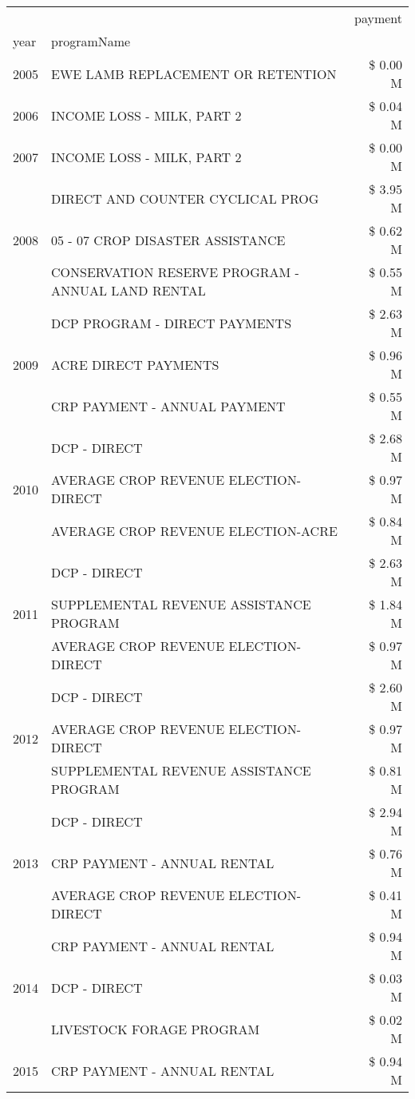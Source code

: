 \begin{tabular}{llr}
\toprule
 &  & payment \\
year & programName &  \\
\midrule
2005 & EWE LAMB REPLACEMENT OR RETENTION & \$ 0.00 M \\
\cline{1-3}
2006 & INCOME LOSS - MILK, PART 2 & \$ 0.04 M \\
\cline{1-3}
2007 & INCOME LOSS - MILK, PART 2 & \$ 0.00 M \\
\cline{1-3}
\multirow[t]{3}{*}{2008} & DIRECT AND COUNTER CYCLICAL PROG & \$ 3.95 M \\
 & 05 - 07 CROP DISASTER ASSISTANCE & \$ 0.62 M \\
 & CONSERVATION RESERVE PROGRAM - ANNUAL LAND RENTAL & \$ 0.55 M \\
\cline{1-3}
\multirow[t]{3}{*}{2009} & DCP PROGRAM - DIRECT PAYMENTS & \$ 2.63 M \\
 & ACRE DIRECT PAYMENTS & \$ 0.96 M \\
 & CRP PAYMENT - ANNUAL PAYMENT & \$ 0.55 M \\
\cline{1-3}
\multirow[t]{3}{*}{2010} & DCP - DIRECT & \$ 2.68 M \\
 & AVERAGE CROP REVENUE ELECTION-DIRECT & \$ 0.97 M \\
 & AVERAGE CROP REVENUE ELECTION-ACRE & \$ 0.84 M \\
\cline{1-3}
\multirow[t]{3}{*}{2011} & DCP - DIRECT & \$ 2.63 M \\
 & SUPPLEMENTAL REVENUE ASSISTANCE PROGRAM & \$ 1.84 M \\
 & AVERAGE CROP REVENUE ELECTION-DIRECT & \$ 0.97 M \\
\cline{1-3}
\multirow[t]{3}{*}{2012} & DCP - DIRECT & \$ 2.60 M \\
 & AVERAGE CROP REVENUE ELECTION-DIRECT & \$ 0.97 M \\
 & SUPPLEMENTAL REVENUE ASSISTANCE PROGRAM & \$ 0.81 M \\
\cline{1-3}
\multirow[t]{3}{*}{2013} & DCP - DIRECT & \$ 2.94 M \\
 & CRP PAYMENT - ANNUAL RENTAL & \$ 0.76 M \\
 & AVERAGE CROP REVENUE ELECTION-DIRECT & \$ 0.41 M \\
\cline{1-3}
\multirow[t]{3}{*}{2014} & CRP PAYMENT - ANNUAL RENTAL & \$ 0.94 M \\
 & DCP - DIRECT & \$ 0.03 M \\
 & LIVESTOCK FORAGE PROGRAM & \$ 0.02 M \\
\cline{1-3}
\multirow[t]{3}{*}{2015} & CRP PAYMENT - ANNUAL RENTAL & \$ 0.94 M \\

\end{tabular}
